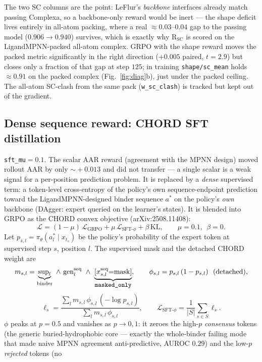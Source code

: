 \documentclass[11pt]{article}
\newcommand{\R}{\mathrm{R}}
\newcommand{\SC}{\mathrm{SC}}
\newcommand{\ttk}[1]{\texttt{\small #1}}
\begin{document}
The two SC columns are the point: LeFlur's \emph{backbone} interfaces already match passing
Complexa, so a backbone-only reward would be inert --- the shape deficit lives entirely in all-atom
packing, where a real $\approx\!0.03$--$0.04$ gap to the passing model ($0.906\!\to\!0.940$)
survives, which is exactly why $\R_{\SC}$ is scored on the LigandMPNN-packed all-atom complex. GRPO
with the shape reward moves the packed metric significantly in the right direction ($+0.005$ paired,
$t\!=\!2.9$) but closes only a fraction of that gap at step $125$; in training \ttk{shape/sc\_mean}
holds $\approx\!0.91$ on the packed complex (Fig.~\ref{fig:diag}b), just under the packed ceiling.
The all-atom SC-clash from the same pack (\ttk{w\_sc\_clash}) is tracked but kept out of the
gradient.

\subsection{Dense sequence reward: CHORD SFT distillation}
\ttk{sft\_mu}$=0.1$. The scalar AAR reward (agreement with the MPNN design) moved rollout AAR by
only $\sim\!+0.013$ and did not transfer --- a single scalar is a weak signal for a per-position
prediction problem. It is replaced by a \emph{dense} supervised term: a token-level
cross-entropy of the policy's own sequence-endpoint prediction toward the LigandMPNN-designed
binder sequence $a^{\ast}$ on the policy's \emph{own} backbone (DAgger: expert queried on the
learner's states). It is blended into GRPO as the CHORD convex objective (arXiv:2508.11408):
\[
\mathcal L=(1-\mu)\,\mathcal L_{\mathrm{GRPO}}+\mu\,\mathcal L_{\text{SFT-}\phi}+\beta\,\mathrm{KL},
\qquad \mu=0.1,\ \ \beta=0 .
\]
Let $p_{s,l}=\pi_\theta(a^{\ast}_l\mid x_{t_s})$ be the policy's probability of the expert token
at supervised step $s$, position $l$. The supervised mask and the detached CHORD weight are
\[
m_{s,l}=\underbrace{\mathrm{sup}_l}_{\text{binder}}\ \wedge\
        \mathrm{gen}^{\text{seq}}_l\ \wedge\
        \underbrace{[x^{\text{seq}}_{s,l}{=}\text{mask}]}_{\ttk{masked\_only}},
\qquad
\phi_{s,l}=p_{s,l}\,(1-p_{s,l})\ \ (\text{detached}),
\]
\[
\ell_s=\frac{\sum_l m_{s,l}\,\phi_{s,l}\,(-\log p_{s,l})}{\sum_l m_{s,l}\,\phi_{s,l}},
\qquad
\mathcal L_{\text{SFT-}\phi}=\frac1{|S|}\sum_{s\in S}\ell_s .
\]
$\phi$ peaks at $p{=}0.5$ and vanishes as $p\!\to\!0,1$: it zeroes the high-$p$ \emph{consensus}
tokens (the generic buried-hydrophobic core --- exactly the whole-binder failing mode that made
naive MPNN agreement anti-predictive, AUROC $0.29$) and the low-$p$ \emph{rejected} tokens (no
\end{document}
